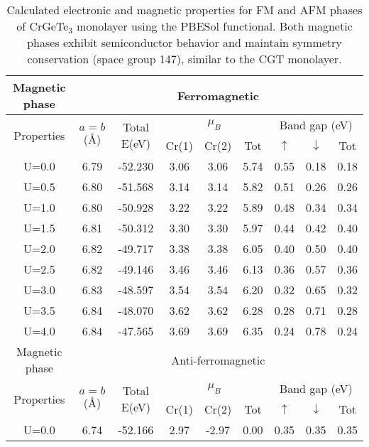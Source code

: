 \begin{table}[H]
	\centering
	\setlength{\extrarowheight}{0.5ex}
	\caption{Calculated electronic and magnetic properties for FM and AFM phases of CrGeTe$_3$ monolayer using the PBESol functional. Both magnetic phases exhibit semiconductor behavior and maintain symmetry conservation (space group 147), similar to the CGT monolayer.}
	\begin{tabular}{cccccc|ccc}
		\toprule
		\toprule
		\rowcolor{WhiteSmoke!70!Lavender}
		Magnetic phase & \multicolumn{8}{c}{Ferromagnetic} \\
		\midrule
		\multirow{2}{*}{Properties} & \multirow{2}{*}{$a=b$(\AA)}& \multirow{2}{*}{Total E(eV)} & \multicolumn{3}{c}{$\mu_{B}$} & \multicolumn{3}{c}{Band gap (eV)}  \\
		\cline{4-9}
		& & & Cr(1)& Cr(2) & Tot  & $\uparrow$ & $\downarrow$ &  Tot \\
		\midrule
		U=0.0 & 6.79 & -52.230 & 3.06 & 3.06 & 5.74 & 0.55 & 0.18 & 0.18 \\
		U=0.5 & 6.80 & -51.568 & 3.14 & 3.14 & 5.82 & 0.51 & 0.26 & 0.26 \\
		U=1.0 & 6.80 & -50.928 & 3.22 & 3.22 & 5.89 & 0.48 & 0.34 & 0.34 \\
		U=1.5 & 6.81 & -50.312 & 3.30 & 3.30 & 5.97 & 0.44 & 0.42 & 0.40 \\
		U=2.0 & 6.82 & -49.717 & 3.38 & 3.38 & 6.05 & 0.40 & 0.50 & 0.40 \\
		U=2.5 & 6.82 & -49.146 & 3.46 & 3.46 & 6.13 & 0.36 & 0.57 & 0.36 \\
		U=3.0 & 6.83 & -48.597 & 3.54 & 3.54 & 6.20 & 0.32 & 0.65 & 0.32 \\
		U=3.5 & 6.84 & -48.070 & 3.62 & 3.62 & 6.28 & 0.28 & 0.71 & 0.28 \\
		U=4.0 & 6.84 & -47.565 & 3.69 & 3.69 & 6.35 & 0.24 & 0.78 & 0.24 \\
		\midrule
		\rowcolor{WhiteSmoke!70!Lavender}
		Magnetic phase & \multicolumn{8}{c}{Anti-ferromagnetic} \\
		\midrule
		\multirow{2}{*}{Properties} & \multirow{2}{*}{$a=b$(\AA)}& \multirow{2}{*}{Total E(eV)} & \multicolumn{3}{c}{$\mu_{B}$} & \multicolumn{3}{c}{Band gap (eV)}  \\
		\cline{4-9}
		& & & Cr(1)& Cr(2) & Tot  & $\uparrow$ & $\downarrow$ &  Tot \\
		\midrule
		U=0.0 & 6.74 & -52.166 & 2.97 & -2.97 & 0.00 & 0.35 & 0.35 & 0.35 \\

\end{tabular}
\end{table}
